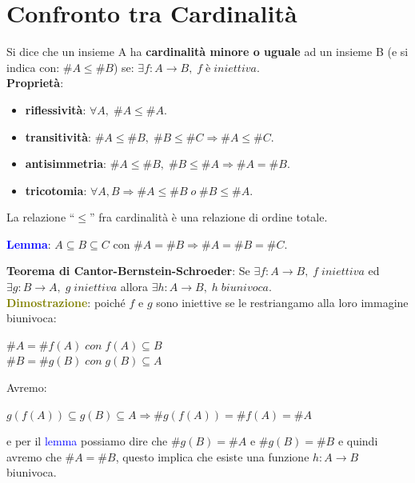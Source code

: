 \section{Confronto tra Cardinalità}
Si dice che un insieme A ha \textbf{cardinalità minore o uguale} ad un insieme B (e si indica con: $\#A \leq \#B$) se: $\exists f : A \rightarrow B, \; f \; è \; iniettiva$. \\
\textbf{Proprietà}:
\begin{itemize}[nosep]
    \item \textbf{riflessività}: $\forall A, \; \#A \leq \#A$.
    \item \textbf{transitività}: $\#A \leq \#B, \; \#B \leq \#C \Rightarrow \#A \leq \#C$.
    \item \textbf{antisimmetria}: $\#A \leq \#B, \; \#B \leq \#A \Rightarrow \#A = \#B$.
    \item \textbf{tricotomia}: $\forall A, B \Rightarrow \#A \leq \#B \; o \; \#B \leq \#A$.
\end{itemize}
La relazione ``$\leq$'' fra cardinalità è una relazione di ordine totale.

\begin{boxA}
    \textcolor{blue}{\textbf{Lemma}}: $A \subseteq B \subseteq C$ con $\#A = \#B \Rightarrow \#A = \#B = \#C$.
\end{boxA}

\textbf{Teorema di Cantor-Bernstein-Schroeder}: Se $\exists f : A \rightarrow B, \; f \; iniettiva$ ed $\exists g : B \rightarrow A, \; g \; iniettiva$ allora $\exists h : A \rightarrow B, \; h \; biunivoca$. \\
\textcolor{olive}{\textbf{Dimostrazione}}: poiché $f$ e $g$ sono iniettive se le restriangamo alla loro immagine biunivoca:
\begin{center}
    $\#A = \#f(A) \; con \; f(A) \subseteq B$ \\
    $\#B = \#g(B) \; con \; g(B) \subseteq A$ \\
\end{center}
Avremo:
\begin{center}
    $g(f(A)) \subseteq g(B) \subseteq A \Rightarrow \#g(f(A)) = \#f(A) = \#A$
\end{center}
e per il \textcolor{blue}{lemma} possiamo dire che $\#g(B) = \#A$ e $\#g(B) = \#B$ e quindi avremo che $\#A = \#B$, questo implica che esiste una funzione $h : A \rightarrow B$ biunivoca.

